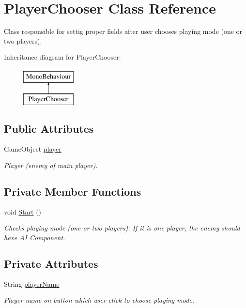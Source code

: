 \hypertarget{class_player_chooser}{}\section{Player\+Chooser Class Reference}
\label{class_player_chooser}


Class responsible for settig proper fields after user chooses playing mode (one or two players).  


Inheritance diagram for Player\+Chooser\+:\begin{figure}[H]
\begin{center}
\leavevmode
\includegraphics[height=2.000000cm]{class_player_chooser}
\end{center}
\end{figure}
\subsection*{Public Attributes}
\begin{DoxyCompactItemize}
\item 
Game\+Object \mbox{\hyperlink{class_player_chooser_a0b6190b6135c1cda958ac9d079a254c8}{player}}
\begin{DoxyCompactList}\small\item\em Player (enemy of main player). \end{DoxyCompactList}\end{DoxyCompactItemize}
\subsection*{Private Member Functions}
\begin{DoxyCompactItemize}
\item 
void \mbox{\hyperlink{class_player_chooser_ac1fe910f0756a8e4a7dd42fec4b4ddda}{Start}} ()
\begin{DoxyCompactList}\small\item\em Checks playing mode (one or two players). If it is one player, the enemy should have AI Component. \end{DoxyCompactList}\end{DoxyCompactItemize}
\subsection*{Private Attributes}
\begin{DoxyCompactItemize}
\item 
String \mbox{\hyperlink{class_player_chooser_ac00fa23a2b9e6ca101d548d1234f5785}{player\+Name}}
\begin{DoxyCompactList}\small\item\em Player name on button which user click to choose playing mode. \end{DoxyCompactList}\end{DoxyCompactItemize}


